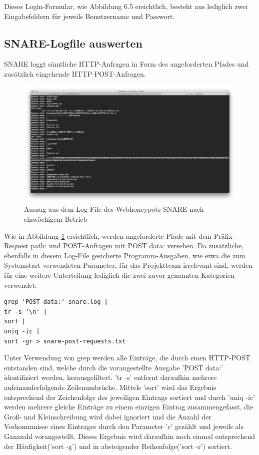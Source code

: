 Dieses Login-Formular, wie Abbildung 6.5 ersichtlich, besteht aus lediglich zwei Eingabefeldern für jeweils Benutzername und Passwort.

\subsection{SNARE-Logfile auswerten}
\label{subsec:Installation und Konfiguration SNARE}

SNARE loggt sämtliche HTTP-Anfragen in Form des angeforderten Pfades und zusätzlich eingehende HTTP-POST-Anfragen.

\begin{figure}[ht]
	\centering
		\includegraphics[width=1.0\textwidth]{img/snare_logfile.png}
	\caption{Auszug aus dem Log-File des Webhoneypots SNARE nach einwöchigem Betrieb}
	\label{fig:snare_login}
\end{figure}

Wie in Abbildung \ref{fig:snare_login} ersichtlich, werden angeforderte Pfade mit dem Präfix \grqq{}Request path:\grqq{} und POST-Anfragen mit \grqq{}POST data:\grqq{} versehen. Da zusätzliche, ebenfalls in diesem Log-File gesicherte Programm-Ausgaben, wie etwa die zum Systemstart verwendeten Parameter, für das Projektteam irrelevant sind, werden für eine weitere Unterteilung lediglich die zwei zuvor genannten Kategorien verwendet.


\begin{lstlisting}[style=customc]
grep 'POST data:' snare.log |
tr -s '\n' |
sort |
uniq -ic |
sort -gr > snare-post-requests.txt
\end{lstlisting}

Unter Verwendung von grep werden alle Einträge, die durch einen HTTP-POST entstanden sind, welche durch die vorangestellte Ausgabe 'POST data:' identifiziert werden, herausgefiltert. 'tr -s' entfernt daraufhin mehrere aufeinanderfolgende Zeilenumbrüche. Mittels 'sort' wird das Ergebnis entsprechend der Zeichenfolge des jeweiligen Eintrags sortiert und durch 'uniq -ic' werden mehrere gleiche Einträge zu einem einzigen Eintrag zusammengefasst, die Groß- und Kleinschreibung wird dabei ignoriert und die Anzahl der Vorkommnisse eines Eintrages durch den Parameter 'c' gezählt und jeweils als Ganzzahl vorangestellt. Dieses Ergebnis wird daraufhin noch einmal entsprechend der Häufigkeit('sort -g') und in absteigender Reihenfolge('sort -r') sortiert.

